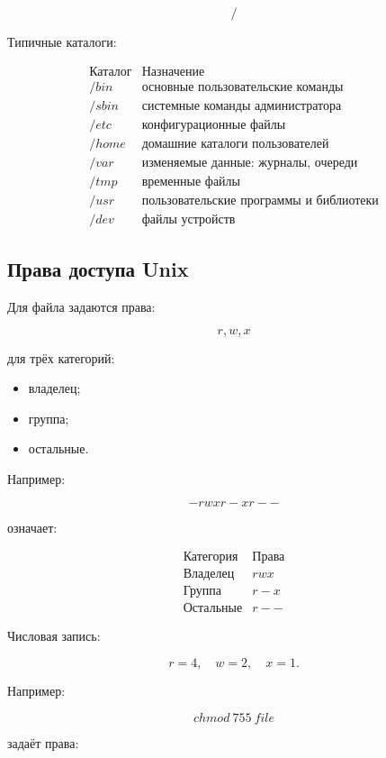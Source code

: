 \documentclass[12pt,a4paper]{article}
\begin{document}
\[
/
\]

Типичные каталоги:

\[
\begin{array}{c|l}
\text{Каталог} & \text{Назначение} \\
\hline
/bin & \text{основные пользовательские команды} \\
/sbin & \text{системные команды администратора} \\
/etc & \text{конфигурационные файлы} \\
/home & \text{домашние каталоги пользователей} \\
/var & \text{изменяемые данные: журналы, очереди} \\
/tmp & \text{временные файлы} \\
/usr & \text{пользовательские программы и библиотеки} \\
/dev & \text{файлы устройств}
\end{array}
\]

\subsection{Права доступа Unix}

Для файла задаются права:

\[
r, w, x
\]

для трёх категорий:

\begin{itemize}
    \item владелец;
    \item группа;
    \item остальные.
\end{itemize}

Например:

\[
-rwxr-xr--
\]

означает:

\[
\begin{array}{c|c}
\text{Категория} & \text{Права} \\
\hline
\text{Владелец} & rwx \\
\text{Группа} & r-x \\
\text{Остальные} & r--
\end{array}
\]

Числовая запись:

\[
r = 4,\quad w = 2,\quad x = 1.
\]

Например:

\[
chmod\ 755\ file
\]

задаёт права:
\end{document}
